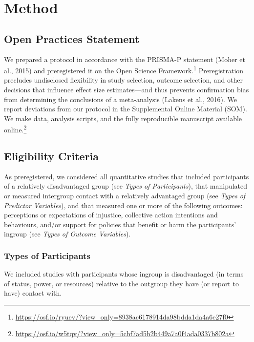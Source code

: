 \documentclass[12pt, letterpaper]{article}
\begin{document}
\hypertarget{method}{%
\section{Method}\label{method}}

\hypertarget{open-practices-statement}{%
\subsection{Open Practices Statement}\label{open-practices-statement}}

We prepared a protocol in accordance with the PRISMA-P statement (Moher
et al., 2015) and preregistered it on the Open Science
Framework.\footnote{\url{https://osf.io/ryuev/?view_only=8938ac6178914da98bdda1da4a6e27f0}}
Preregistration precludes undisclosed flexibility in study selection,
outcome selection, and other decisions that influence effect size
estimates---and thus prevents confirmation bias from determining the
conclusions of a meta-analysis (Lakens et al., 2016). We report
deviations from our protocol in the Supplemental Online Material (SOM).
We make data, analysis scripts, and the fully reproducible manuscript
available online.\footnote{\url{https://osf.io/w5tqv/?view_only=5cbf7ad5b2b449a7a0f4ada0337b802a}}

\hypertarget{eligibility-criteria}{%
\subsection{Eligibility Criteria}\label{eligibility-criteria}}

As preregistered, we considered all quantitative studies that included
participants of a relatively disadvantaged group (see \emph{Types of
Participants}), that manipulated or measured intergroup contact with a
relatively advantaged group (see \emph{Types of Predictor Variables}),
and that measured one or more of the following outcomes: perceptions or
expectations of injustice, collective action intentions and behaviours,
and/or support for policies that benefit or harm the participants'
ingroup (see \emph{Types of Outcome Variables}).

\hypertarget{types-of-participants}{%
\subsubsection{Types of Participants}\label{types-of-participants}}

We included studies with participants whose ingroup is disadvantaged (in
terms of status, power, or resources) relative to the outgroup they have
(or report to have) contact with.
\end{document}
